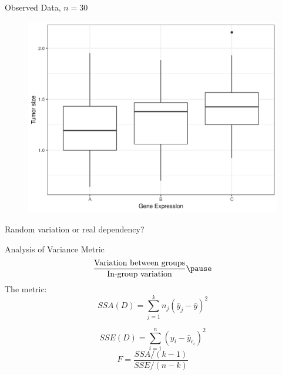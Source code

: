 \documentclass{beamer}
\newcommand{\sse}{\textit{SSE}\xspace}
\newcommand{\ssa}{\textit{SSA}\xspace}
\begin{document}
\begin{frame}{Observed Data, $n=30$}
\pause
\begin{figure}
  \includegraphics[scale=0.5]{simulation/observed-plot}
\end{figure}
\pause
Random variation or real dependency?
\end{frame}

\begin{frame}{Analysis of Variance Metric}
\pause
\begin{equation*}
 \frac{\text{Variation between groups}}{\text{In-group variation}} \pause 
\end{equation*}
\pause
The metric:
\begin{equation*}
\ssa(D) = \sum_{j=1}^{k} n_j (\bar{y}_j - \bar{y})^2
\end{equation*}

\begin{equation*}
\sse(D) = \sum_{i=1}^{n}  (y_{i}-\bar{y}_{c_i})^2
\end{equation*}
\begin{equation*}
F = \frac{\ssa/(k-1)}{\sse/(n-k)}
\end{equation*}
\end{frame}
\end{document}
